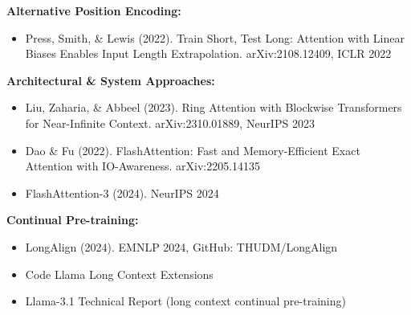\documentclass[11pt,letterpaper]{article}
\begin{document}
\textbf{Alternative Position Encoding:}
\begin{itemize}[leftmargin=*]
    \item Press, Smith, \& Lewis (2022). Train Short, Test Long: Attention with Linear Biases Enables Input Length Extrapolation. arXiv:2108.12409, ICLR 2022
\end{itemize}

\textbf{Architectural \& System Approaches:}
\begin{itemize}[leftmargin=*]
    \item Liu, Zaharia, \& Abbeel (2023). Ring Attention with Blockwise Transformers for Near-Infinite Context. arXiv:2310.01889, NeurIPS 2023
    \item Dao \& Fu (2022). FlashAttention: Fast and Memory-Efficient Exact Attention with IO-Awareness. arXiv:2205.14135
    \item FlashAttention-3 (2024). NeurIPS 2024
\end{itemize}

\textbf{Continual Pre-training:}
\begin{itemize}[leftmargin=*]
    \item LongAlign (2024). EMNLP 2024, GitHub: THUDM/LongAlign
    \item Code Llama Long Context Extensions
    \item Llama-3.1 Technical Report (long context continual pre-training)
\end{itemize}
\end{document}
